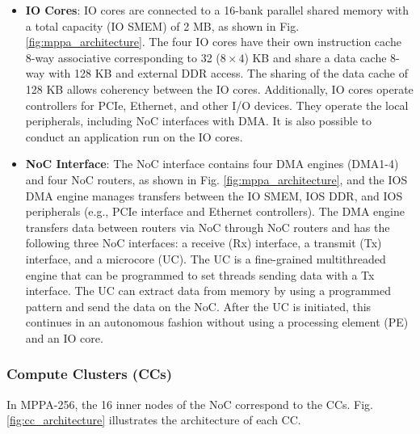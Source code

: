   \begin{itemize}
    \setlength{\leftskip}{-5mm}    
    \item \textbf{IO Cores}: IO cores are connected to a 16-bank parallel shared memory with a total capacity (IO SMEM) of 2 MB, as shown in Fig. \ref{fig:mppa_architecture}.
    The four IO cores have their own instruction cache 8-way associative corresponding to 32 ($8 \times 4$) KB and share a data cache 8-way with 128 KB and external DDR access.
    The sharing of the data cache of 128 KB allows coherency between the IO cores.
    Additionally, IO cores operate controllers for PCIe, Ethernet, and other I/O devices.
    They operate the local peripherals, including NoC interfaces with DMA.
    It is also possible to conduct an application run on the IO cores.
    
    \item \textbf{NoC Interface}: The NoC interface contains four DMA engines (DMA1-4) and four NoC routers, as shown in Fig. \ref{fig:mppa_architecture}, and the IOS DMA engine manages transfers between the IO SMEM, IOS DDR, and IOS peripherals (e.g., PCIe interface and Ethernet controllers).
    The DMA engine transfers data between routers via NoC through NoC routers and has the following three NoC interfaces: a receive (Rx) interface, a transmit (Tx) interface, and a microcore (UC).
    The UC is a fine-grained multithreaded engine that can be programmed to set threads sending data with a Tx interface.
    The UC can extract data from memory by using a programmed pattern and send the data on the NoC.
    After the UC is initiated, this continues in an autonomous fashion without using a processing element (PE) and an IO core.
  \end{itemize}
  
  \subsubsection{Compute Clusters (CCs)}
  \label{sec:cc}
  In MPPA-256, the 16 inner nodes of the NoC correspond to the CCs.
  Fig. \ref{fig:cc_architecture} illustrates the architecture of each CC.
  

